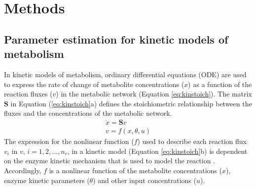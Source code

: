 \documentclass[10pt]{article}
\begin{document}
 
	
	\section{Methods}\label{sec:methods}
	\subsection{Parameter estimation for kinetic models of metabolism}\label{sec:kinetic_model}
	In kinetic models of metabolism, ordinary differential equations (ODE) are used to express the rate of change of metabolite concentrations ($x$) as a function of the reaction fluxes ($v$) in the metabolic network (Equation \ref{eq:kinstoich}). The matrix $\mathbf{S}$ in Equation (\ref{eq:kinstoich}a) defines the stoichiometric relationship between the fluxes and the concentrations of the metabolic network.
	\begin{subequations}\label{eq:kinstoich}
		\begin{align}
		\dot{x} = \mathbf{S}v\\
		v = f(x, \theta, u)
		\end{align}
	\end{subequations}
	The expression for the nonlinear function ($f$) used to describe each reaction flux $v_i$ in $v$, $i={1, 2, ..., n_r}$, in a kinetic model (Equation \ref{eq:kinstoich}b) is dependent on the enzyme kinetic mechanism that is used to model the reaction \parencite{Srinivasan2015}. Accordingly, $f$ is a nonlinear function of the metabolite concentrations ($x$), enzyme kinetic parameters ($\theta$) and other input concentrations ($u$). 
	
\end{document}
